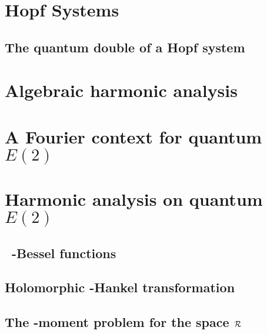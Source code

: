 \documentclass{book}
\begin{document}
\chapter{Hopf Systems}
\label{chapter:Hopf_systems}









\section{The quantum double of a Hopf system}
\label{quantum_double}





\chapter{Algebraic harmonic analysis}
\label{chapter:algebraic_harmonic_analysis}




\chapter{A Fourier context for quantum $E(2)$}
\label{chapter:Fourier_context_for_quantumE2}








\chapter{Harmonic analysis on quantum $E(2)$}
\label{chapter:Harmonic_analysis_on_quantumE2}


\section{\Little\ {\protect\qfragile}-Bessel functions}
\label{sec:qExp_and_qBessel}



\section{Holomorphic {\protect\qfragile}-Hankel transformation}
\label{sec:qHankel}





\section{The {\protect\qfragile}-moment problem for the space $\mathcal R$}
\label{sec:qHankel:qmoment_problem}

\end{document}
